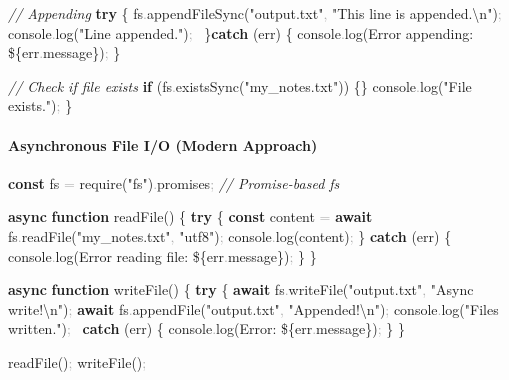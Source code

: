 \documentclass[
  justified,
  openright,
]{tufte-book}
\let\subsection\paragraph
\let\paragraph\paragraph
\newcommand{\KeywordTok}[1]{\textcolor{CodeKeyword}{\textbf{#1}}}  %
\newcommand{\StringTok}[1]{\textcolor{CodeString}{#1}}              %
\newcommand{\CommentTok}[1]{\textcolor{CodeComment}{\textit{#1}}}  %
\newcommand{\CodeFuncTok}[1]{\textcolor{CodeKeyword}{#1}}           %
\newcommand{\CodeTypeTok}[1]{\textcolor{CodeType}{#1}}              %
\newcommand{\CodeAccentTok}[1]{\textcolor{CodeAccent}{#1}}          %
\newcommand{\OperatorTok}[1]{\textcolor{DarkGray}{#1}}              %
\newenvironment{Shaded}{%
  \begin{mdframed}[style=TufteCode]%
}{%
  \end{mdframed}%
}
\let\subsection\paragraph
\let\paragraph\paragraph
\begin{document}
\begin{Shaded}
\begin{Highlighting}[]
\CommentTok{// Appending}
\KeywordTok{try} \{
  fs\OperatorTok{.}\CodeFuncTok{appendFileSync}(\StringTok{"output.txt"}\OperatorTok{,} \StringTok{"This line is appended.}\StringTok{\textbackslash{}n}\StringTok{"})\OperatorTok{;}
  console\OperatorTok{.}\CodeFuncTok{log}(\StringTok{"Line appended."})\OperatorTok{;}
\ \}\KeywordTok{catch} (err) \{
  console\OperatorTok{.}\CodeFuncTok{log}(\StringTok{\textasciigrave{}Error appending: }\StringTok{\$\{}err\OperatorTok{.}\CodeTypeTok{message}\StringTok{\}}\StringTok{\textasciigrave{}})\OperatorTok{;}
\}
 
\CommentTok{// Check if file exists}
\KeywordTok{if} (fs\OperatorTok{.}\CodeFuncTok{existsSync}(\StringTok{"my\_notes.txt"})) \{\}
  console\OperatorTok{.}\CodeFuncTok{log}(\StringTok{"File exists."})\OperatorTok{;}
\}
\end{Highlighting}
\end{Shaded}

\subsection{Asynchronous File I/O (Modern
Approach)}\label{asynchronous-file-io-modern-approach}

\begin{Shaded}
\begin{Highlighting}[]
\KeywordTok{const} fs \OperatorTok{=} \CodeAccentTok{require}(\StringTok{"fs"})\OperatorTok{.}\CodeTypeTok{promises}\OperatorTok{;} \CommentTok{// Promise{-}based fs}
 
\KeywordTok{async} \KeywordTok{function} \CodeFuncTok{readFile}() \{
  \KeywordTok{try} \{
    \KeywordTok{const} content \OperatorTok{=} \KeywordTok{await} fs\OperatorTok{.}\CodeFuncTok{readFile}(\StringTok{"my\_notes.txt"}\OperatorTok{,} \StringTok{"utf8"})\OperatorTok{;}
    console\OperatorTok{.}\CodeFuncTok{log}(content)\OperatorTok{;}
  \} \KeywordTok{catch} (err) \{
    console\OperatorTok{.}\CodeFuncTok{log}(\StringTok{\textasciigrave{}Error reading file: }\StringTok{\$\{}err\OperatorTok{.}\CodeTypeTok{message}\StringTok{\}}\StringTok{\textasciigrave{}})\OperatorTok{;}
  \}
\}
 
\KeywordTok{async} \KeywordTok{function} \CodeFuncTok{writeFile}() \{
  \KeywordTok{try} \{
    \KeywordTok{await} fs\OperatorTok{.}\CodeFuncTok{writeFile}(\StringTok{"output.txt"}\OperatorTok{,} \StringTok{"Async write!}\StringTok{\textbackslash{}n}\StringTok{"})\OperatorTok{;}
    \KeywordTok{await} fs\OperatorTok{.}\CodeFuncTok{appendFile}(\StringTok{"output.txt"}\OperatorTok{,} \StringTok{"Appended!}\StringTok{\textbackslash{}n}\StringTok{"})\OperatorTok{;}
    console\OperatorTok{.}\CodeFuncTok{log}(\StringTok{"Files written."})\OperatorTok{;}
  \ \KeywordTok{catch} (err) \{
    console\OperatorTok{.}\CodeFuncTok{log}(\StringTok{\textasciigrave{}Error: }\StringTok{\$\{}err\OperatorTok{.}\CodeTypeTok{message}\StringTok{\}}\StringTok{\textasciigrave{}})\OperatorTok{;}
  \}
\}
 
\CodeFuncTok{readFile}()\OperatorTok{;}
\CodeFuncTok{writeFile}()\OperatorTok{;}
\end{Highlighting}
\end{Shaded}
\end{document}
